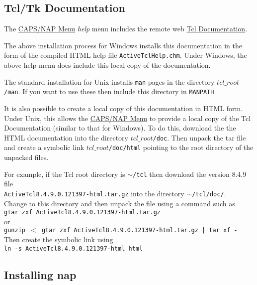   \subsection{
    \label{tcl:doc}Tcl/Tk Documentation
  }
The 
  \href{caps-nap-menu.html}{CAPS/NAP Menu} 
  \emph{help} menu includes the remote web 
  \href{http://aspn.activestate.com/ASPN/Tcl/Reference/}{Tcl Documentation}.
  \par The above installation process for Windows installs this
  documentation in the form of the compiled HTML help file 
  \texttt{ActiveTclHelp.chm}. Under Windows, the above help menu
  does include this local copy of the documentation.
  \par The standard installation for Unix installs 
  \texttt{man} pages in the directory 
  $tcl\_root$\texttt{/man}. If you want to use these then include this
  directory in 
  \texttt{MANPATH}.
  \par It is also possible to create a local copy of this documentation
  in HTML form. Under Unix, this allows the 
  \href{caps-nap-menu.html}{CAPS/NAP Menu} to provide a local
  copy of the Tcl Documentation (similar to that for Windows). To do
  this, download the the HTML documentation into the directory 
  $tcl\_root$\texttt{/doc}. Then unpack the tar file and create a symbolic
  link 
  $tcl\_root$\texttt{/doc/html} pointing to the root directory of the unpacked
  files.
  \par For example, if the Tcl root directory is 
  \texttt{$\sim$/tcl} then download the version 8.4.9 file 
  \\
  \texttt{ActiveTcl8.4.9.0.121397-html.tar.gz} into the directory 
  \texttt{$\sim$/tcl/doc/}.
  \\Change to this directory and then unpack the file using a
  command such as
  \\
  \texttt{gtar zxf ActiveTcl8.4.9.0.121397-html.tar.gz}
  \\or
  \\
  \texttt{gunzip $<$ gtar zxf ActiveTcl8.4.9.0.121397-html.tar.gz | tar xf -}
  \\Then create the symbolic link using
  \\
  \texttt{ln -s ActiveTcl8.4.9.0.121397-html html}
  \\
  \subsection{
    \label{Installing:nap}Installing nap
  }

